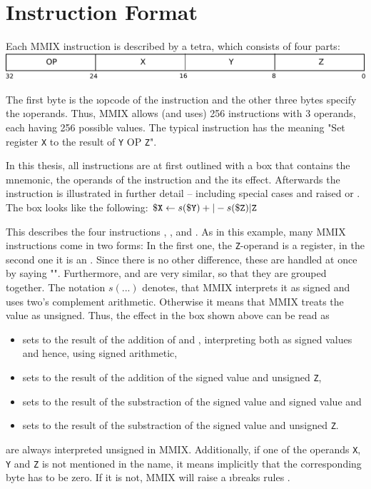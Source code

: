 \section{Instruction Format}

Each MMIX instruction is described by a tetra, which consists of four parts:\\
\includegraphics[width=\linewidth]{img/instruction-crop.pdf}

The first byte is the \i{opcode} of the instruction and the other three bytes specify the \i{operands}. Thus, MMIX allows (and uses) 256 instructions with 3 operands, each having 256 possible values. The typical instruction has the meaning "Set register {\tt X} to the result of {\tt Y} OP {\tt Z}". \citep[pg. 2]{mmix-doc}

In this thesis, all instructions are at first outlined with a box that contains the mnemonic, the operands of the instruction and the its effect. Afterwards the instruction is illustrated in further detail -- including special cases and raised  or . The box looks like the following:
\instrtbl
	{}
	{${\tt \$X} \leftarrow s({\tt \$Y}) +|- s({\tt \$Z}){\tt|Z}$}

\noindent This describes the four instructions , ,  and . As in this example, many MMIX instructions come in two forms: In the first one, the {\tt Z}-operand is a register, in the second one it is an . Since there is no other difference, these are handled at once by saying "". Furthermore,  and  are very similar, so that they are grouped together. The notation $s(...)$ denotes, that MMIX interprets it as signed and uses two's complement arithmetic. Otherwise it means that MMIX treats the value as unsigned. Thus, the effect in the box shown above can be read as
\begin{itemize}
	\item {} sets  to the result of the addition of  and , interpreting both as signed values and hence, using signed arithmetic,
	\item {} sets  to the result of the addition of the signed value  and unsigned  {\tt Z},
	\item {} sets  to the result of the substraction of the signed value  and signed value  and
	\item {} sets  to the result of the substraction of the signed value  and unsigned  {\tt Z}.
\end{itemize}
 are always interpreted unsigned in MMIX. Additionally, if one of the operands {\tt X}, {\tt Y} and {\tt Z} is not mentioned in the name, it means implicitly that the corresponding byte has to be zero. If it is not, MMIX will raise a \i{breaks rules} .

